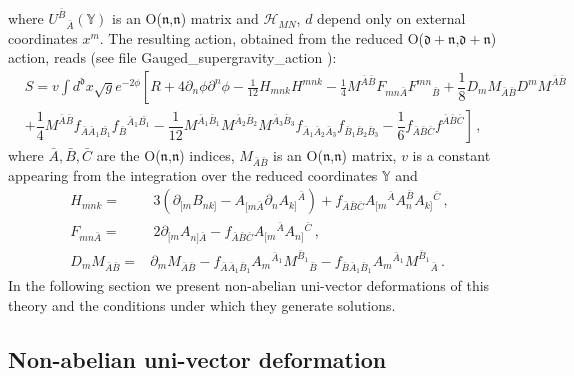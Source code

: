 \documentclass[12pt, utf8]{article}
\numberwithin{equation}{section}
\begin{document}
where $ U^{\bar{B}}{}_{\bar{A}}(\mathbb{Y})$ is an O($\mathfrak{n}$,$\mathfrak{n}$) matrix and ${\mathcal{H}}_{M N}$, $d$ depend only on external coordinates $x^m$. The resulting action, obtained from the reduced O($\mathfrak{d}+\mathfrak{n}$,$\mathfrak{d}+\mathfrak{n}$) action, reads (see file Gauged\_supergravity\_action \cite{Gubarev:2025nonabelianuni}):
\begin{equation} \label{action gauged supergravity}
\begin{aligned}
&  S=v \int d^{\mathfrak{d}} x \sqrt{g} e^{-2 \phi}\left[ R+4 \partial_n \phi \partial^n \phi-\frac{1}{12} H_{m n k} H^{m n k}-\frac{1}{4} M^{\bar{A} \bar{B}} F_{m n \bar{A}} F^{m n}{}_{\bar{B}}  + \dfrac{1}{8}D_{m}M_{\bar{A} \bar{B}} D^{m}M^{\bar{A} \bar{B}} \right. \\
  & \left.  + \dfrac{1}{4} M^{\bar{A} \bar{B}} f_{\bar{A} \bar{A}_1 \bar{B_{1}}} f_{\bar{B}}{}^{\bar{A}_1 \bar{B_{1}}}  - \dfrac{1}{12} M^{\bar{A}_1 \bar{B}_1} M^{\bar{A}_2 \bar{B}_2} M^{\bar{A}_3 \bar{B}_3} f_{\bar{A}_1 \bar{A}_2 \bar{A}_3 } f_{\bar{B}_1 \bar{B}_2 \bar{B}_3 } - \dfrac{1}{6} f_{\bar{A} \bar{B} \bar{C}}f^{\bar{A} \bar{B} \bar{C}} \right] \, ,
\end{aligned}
\end{equation}
where $\bar{A}, \bar{B},\bar{C}$ are the O($\mathfrak{n}$,$\mathfrak{n}$) indices, $M_{\bar{A} \bar{B}}$ is an O($\mathfrak{n}$,$\mathfrak{n}$) matrix, $v$ is a constant appearing from the integration over the reduced coordinates $\mathbb{Y}$ and
\begin{equation}
    \begin{aligned}
       H_{m n k} =&\ 3\left(\partial_{[m} B_{n k]}- A_{[m \bar{A}} \partial_n A_{k]}{}^{\bar{A}}\right)+ f_{\bar{A} \bar{B} \bar{C}} A_{[m}{ }^{\bar{A}} A_n^{\bar{B}} A_{k]}{}^{\bar{C}} \, , \\
    F_{m n \bar{A}} =&\ 2 \partial_{[m} A_{n] \bar{A}} - f_{\bar{A} \bar{B} \bar{C} } A_{[m}{}^{\bar{A}} A_{n]}{}^{\bar{C}} \, , \\
     D_{m}M_{\bar{A} \bar{B}} = &   \partial_{m}M_{\bar{A} \bar{B}} - f_{\bar{A} \bar{A}_1 \bar{B}_1} A_{m}{}^{\bar{A}_1} M^{\bar{B}_1}{}_{\bar{B}} - f_{\bar{B} \bar{A}_1 \bar{B}_1} A_{m}{}^{\bar{A}_1} M^{\bar{B}_1}{}_{\bar{A}} \, .
    \end{aligned}
\end{equation}
In the following section we present non-abelian uni-vector deformations of this theory and  the conditions under which they generate solutions.

\subsection{Non-abelian uni-vector deformation}\label{gaugedsugradef}
\end{document}
